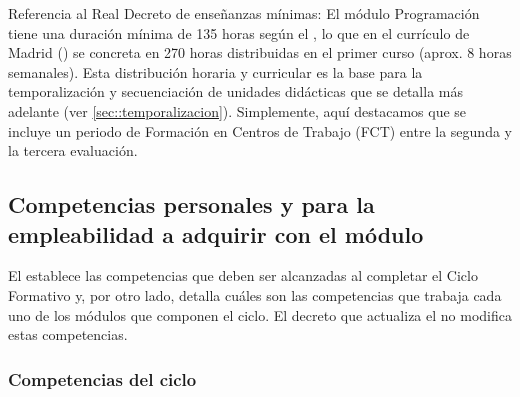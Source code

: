 


Referencia al Real Decreto de enseñanzas mínimas: El módulo Programación tiene una duración mínima de 135 horas según el , lo que en el currículo de Madrid () se concreta en 270 horas distribuidas en el primer curso (aprox. 8 horas semanales). Esta distribución horaria y curricular es la base para la temporalización y secuenciación de unidades didácticas que se detalla más adelante (ver \ref{sec::temporalizacion}). Simplemente, aquí destacamos que se incluye un periodo de Formación en Centros de Trabajo (FCT) entre la segunda y la tercera evaluación.


\subsection{Competencias personales y para la empleabilidad a adquirir con el módulo}

El  establece las competencias que deben ser alcanzadas al completar el Ciclo Formativo y, por otro lado, detalla cuáles son las competencias que trabaja cada uno de los módulos que componen el ciclo. El decreto  que actualiza el  no modifica estas competencias.

\subsubsection{Competencias del ciclo}

